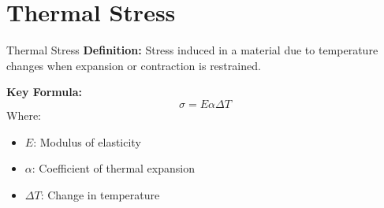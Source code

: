 \documentclass{beamer}
\begin{document}
\section{Thermal Stress}
\begin{frame}{Thermal Stress}
    \textbf{Definition:}
    Stress induced in a material due to temperature changes when expansion or contraction is restrained.
    \vspace{0.5cm}

    \textbf{Key Formula:}
    \[ \sigma = E \alpha \Delta T \]
    Where:
    \begin{itemize}
        \item $E$: Modulus of elasticity
        \item $\alpha$: Coefficient of thermal expansion
        \item $\Delta T$: Change in temperature
    \end{itemize}
\end{frame}

\end{document}
